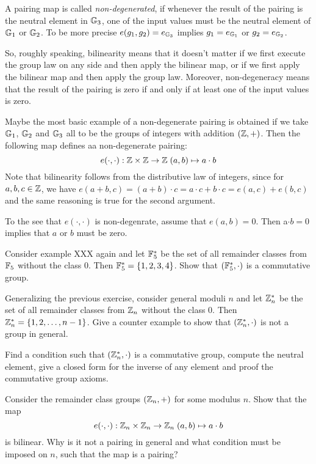 A pairing map is called \textit{non-degenerated}, if whenever the result of the pairing is the neutral element in $\mathbb{G}_3$, one of the input values must be the neutral element of $\mathbb{G}_1$ or $\mathbb{G}_2$. To be more precise $e(g_1,g_2)=e_{\mathbb{G}_3}$ implies $g_1=e_{\mathbb{G}_1}$ or $g_2=e_{\mathbb{G}_2}$.

So, roughly speaking, bilinearity means that it doesn't matter if we first execute the group law on any side and then apply the bilinear map, or if we first apply the bilinear map and then apply the group law. Moreover, non-degeneracy means that the result of the pairing is zero if and only if at least one of the input values is zero.
\begin{example}Maybe the most basic example of a non-degenerate pairing is obtained if we take $\mathbb{G}_1$, $\mathbb{G}_2$ and $\mathbb{G}_3$ all to be the groups of integers with addition $(\mathbb{Z},+)$. Then the following map defines aa non-degenerate pairing:
$$
e(\cdot,\cdot): \mathbb{Z} \times \mathbb{Z} \to \mathbb{Z} \; (a,b)\mapsto a\cdot b
$$
Note that bilinearity follows from the distributive law of integers, since for $a,b,c\in \mathbb{Z}$, we have $e(a+b,c)=(a+b)\cdot c = a\cdot c + b\cdot c = e(a,c)+ e(b,c)$ and the same reasoning is true for the second argument.

To the see that $e(\cdot,\cdot)$ is non-degenrate, assume that $e(a,b)=0$. Then a$\cdot b =0$ implies that $a$ or $b$ must be zero.
\end{example}

\begin{exercise}\label{fstar} Consider example XXX again and let $\mathbb{F}_5^*$ be the set of all remainder classes from $\mathbb{F}_5$ without the class $0$. Then $\mathbb{F}_5^*=\{1,2,3,4\}$. Show that $(\mathbb{F}_5^*,\cdot)$ is a commutative group.
\end{exercise}
\begin{exercise} Generalizing the previous exercise, consider general moduli $n$ and let $\mathbb{Z}_n^*$ be the set of all remainder classes from $\mathbb{Z}_n$ without the class $0$. Then $\mathbb{Z}_n^*=\{1,2,\ldots,n-1\}$. Give a counter example to show that $(\mathbb{Z}^*_n,\cdot)$ is not a group in general.

Find a condition such that $(\mathbb{Z}^*_n,\cdot)$ is a commutative group, compute the neutral element, give a closed form for the inverse of any element and proof the commutative group axioms.
\end{exercise}
\begin{exercise} Consider the remainder class groups $(\mathbb{Z}_n,+)$ for some modulus $n$. Show that the map
$$
e(\cdot,\cdot): \mathbb{Z}_n \times \mathbb{Z}_n \to \mathbb{Z}_n \; (a,b)\mapsto a\cdot b
$$
is bilinear. Why is it not a pairing in general and what condition must be imposed on $n$, such that the map is a pairing?
\end{exercise}
